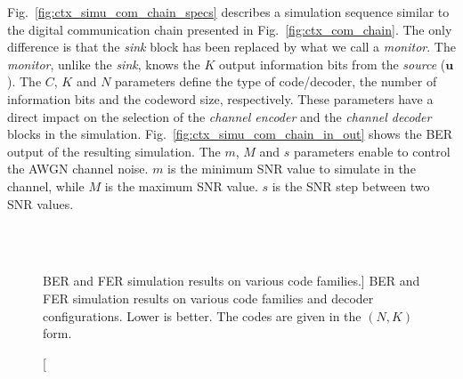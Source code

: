 Fig.~\ref{fig:ctx_simu_com_chain_specs} describes a simulation sequence similar
to the digital communication chain presented in Fig.~\ref{fig:ctx_com_chain}.
The only difference is that the \emph{sink} block has been replaced by what we
call a \emph{monitor}. The \emph{monitor}, unlike the \emph{sink}, knows the $K$
output information bits from the \emph{source} ($\bm{u}$). The $C$, $K$ and $N$
parameters define the type of code/decoder, the number of information bits and
the codeword size, respectively. These parameters have a direct impact on the
selection of the \emph{channel encoder} and the \emph{channel decoder} blocks
in the simulation. Fig.~\ref{fig:ctx_simu_com_chain_in_out} shows the BER output
of the resulting simulation. The $m$, $M$ and $s$ parameters enable to control
the AWGN channel noise. $m$ is the minimum SNR value to simulate in the channel,
while $M$ is the maximum SNR value. $s$ is the SNR step between two SNR values.

\begin{figure}[htp]
  \centering
     \quad{}
    \\
    \quad{}
      \\
   \quad{}
  \caption
    [BER and FER simulation results on various code families.]
    {BER and FER simulation results on various code families and decoder
    configurations. Lower is better. The codes are given in the $(N,K)$ form.}
  \label{fig:ctx_bfer}
\end{figure}


